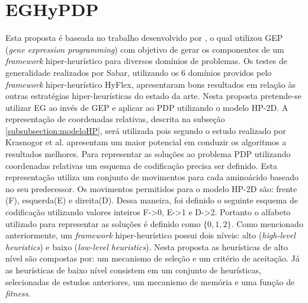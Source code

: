 \section{EGHyPDP}
Esta proposta é baseada no trabalho desenvolvido por \cite{sabar2015automatic}, o qual  utilizou GEP (\textit{gene expression programming}) com objetivo de gerar os componentes de um \textit{framework} hiper-heurístico para diversos domínios de problemas. Os testes de generalidade realizados por Sabar, utilizando os 6 domínios providos pelo \textit{framework} hiper-heurístico HyFlex, apresentaram bons resultados em relação às outras estratégias hiper-heurísticas do estado da arte. Nesta proposta pretende-se utilizar EG ao invés de GEP e aplicar ao PDP utilizando o modelo HP-2D. A representação de coordenadas relativas, descrita na subseção \ref{subsubsection:modeloHP}, será utilizada pois segundo o estudo realizado por Krasnogor et al. \cite{krasnogor1999protein} apresentam um maior potencial em conduzir os algoritmos a resultados melhores. Para representar as soluções ao problema PDP utilizando coordenadas relativas um esquema de codificação precisa ser definido. Esta representação utiliza um conjunto de movimentos para cada aminoácido baseado no seu predecessor. Os movimentos permitidos para o modelo HP-2D são: frente (F), esquerda(E) e direita(D). Dessa maneira, foi definido o seguinte esquema de codificação utilizando valores inteiros F->0, E->1 e D->2. Portanto o alfabeto utilizado para representar as soluções é definido como $\{0,1,2\}$. Como mencionado anteriormente, um \textit{framework} hiper-heurístico possui dois níveis: alto (\textit{high-level heuristics}) e baixo (\textit{low-level heuristics}). Nesta proposta as heurísticas de alto nível são compostas por: um mecanismo de seleção e um critério de aceitação. Já as heurísticas de baixo nível consistem em um conjunto de heurísticas, selecionadas de estudos anteriores, um mecanismo de memória e uma função de \textit{fitness}. 